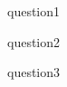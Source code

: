 \documentclass[12pt, a4paper, english]{article}
\begin{document}
\maketitle

{question1}

\newpage

{question2}

\newpage

{question3}
\end{document}
